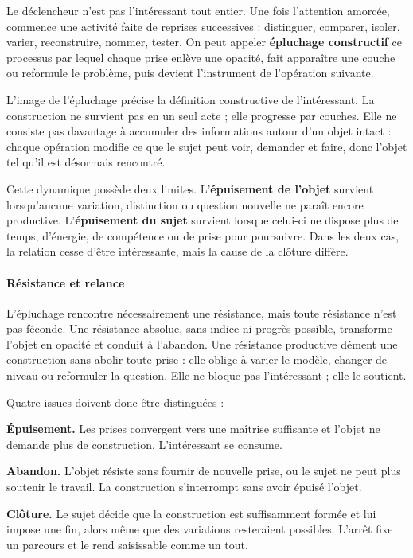 \documentclass[10pt,a4paper]{article}
\begin{document}
Le déclencheur n'est pas l'intéressant tout entier. Une fois l'attention amorcée, commence une activité faite de reprises successives : distinguer, comparer, isoler, varier, reconstruire, nommer, tester. On peut appeler \textbf{épluchage constructif} ce processus par lequel chaque prise enlève une opacité, fait apparaître une couche ou reformule le problème, puis devient l'instrument de l'opération suivante.

L'image de l'épluchage précise la définition constructive de l'intéressant. La construction ne survient pas en un seul acte ; elle progresse par couches. Elle ne consiste pas davantage à accumuler des informations autour d'un objet intact : chaque opération modifie ce que le sujet peut voir, demander et faire, donc l'objet tel qu'il est désormais rencontré.

Cette dynamique possède deux limites. L'\textbf{épuisement de l'objet} survient lorsqu'aucune variation, distinction ou question nouvelle ne paraît encore productive. L'\textbf{épuisement du sujet} survient lorsque celui-ci ne dispose plus de temps, d'énergie, de compétence ou de prise pour poursuivre. Dans les deux cas, la relation cesse d'être intéressante, mais la cause de la clôture diffère.

\paragraph{Résistance et relance}
L'épluchage rencontre nécessairement une résistance, mais toute résistance n'est pas féconde. Une résistance absolue, sans indice ni progrès possible, transforme l'objet en opacité et conduit à l'abandon. Une résistance productive dément une construction sans abolir toute prise : elle oblige à varier le modèle, changer de niveau ou reformuler la question. Elle ne bloque pas l'intéressant ; elle le soutient.

Quatre issues doivent donc être distinguées :

\textbf{Épuisement.} Les prises convergent vers une maîtrise suffisante et l'objet ne demande plus de construction. L'intéressant se consume.

\textbf{Abandon.} L'objet résiste sans fournir de nouvelle prise, ou le sujet ne peut plus soutenir le travail. La construction s'interrompt sans avoir épuisé l'objet.

\textbf{Clôture.} Le sujet décide que la construction est suffisamment formée et lui impose une fin, alors même que des variations resteraient possibles. L'arrêt fixe un parcours et le rend saisissable comme un tout.
\end{document}
